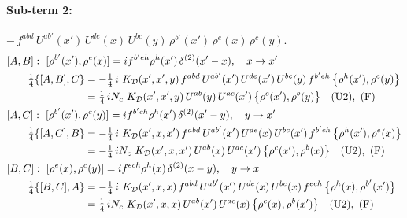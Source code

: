 \documentclass[10pt]{article}
\numberwithin{equation}{section}
\begin{document}
\paragraph{Sub-term 2:} $-\,f^{abd}\,U^{ab'}(x')\,U^{de}(x)\,U^{bc}(y)\,\rho^{b'}(x')\,\rho^{e}(x)\,\rho^{c}(y)$.
\begin{align}
&[A,B]:\ [\rho^{b'}(x'),\rho^{e}(x)]=i f^{b'eh}\rho^{h}(x')\,\delta^{(2)}(x'-x),\quad x\to x'\notag\\
&\qquad \tfrac14\{[A,B],C\}=-\tfrac14\,i\,\,K_{\mathcal D}(x',x',y)\,f^{abd}\,U^{ab'}(x')\,U^{de}(x')\,U^{bc}(y)\,f^{b'eh}\,\big\{\rho^{h}(x'),\rho^{c}(y)\big\}\notag\\
&\qquad\phantom{\tfrac14\{[A,B],C\}}=\tfrac14\,i N_{c}\,\,K_{\mathcal D}(x',x',y)\,U^{ab}(y)\,U^{ac}(x')\,\big\{\rho^{c}(x'),\rho^{b}(y)\big\}\quad\text{(U2)},\ \text{(F)}
\label{eq:D-2-AB}\\
&[A,C]:\ [\rho^{b'}(x'),\rho^{c}(y)]=i f^{b'ch}\rho^{h}(x')\,\delta^{(2)}(x'-y),\quad y\to x'\notag\\
&\qquad \tfrac14\{[A,C],B\}=-\tfrac14\,i\,\,K_{\mathcal D}(x',x,x')\,f^{abd}\,U^{ab'}(x')\,U^{de}(x)\,U^{bc}(x')\,f^{b'ch}\,\big\{\rho^{h}(x'),\rho^{e}(x)\big\}\notag\\
&\qquad\phantom{\tfrac14\{[A,C],B\}}=-\tfrac14\,i N_{c}\,\,K_{\mathcal D}(x',x,x')\,U^{ab}(x)\,U^{ac}(x')\,\big\{\rho^{c}(x'),\rho^{b}(x)\big\}\quad\text{(U2)},\ \text{(F)}
\label{eq:D-2-AC}\\
&[B,C]:\ [\rho^{e}(x),\rho^{c}(y)]=i f^{ech}\rho^{h}(x)\,\delta^{(2)}(x-y),\quad y\to x\notag\\
&\qquad \tfrac14\{[B,C],A\}=-\tfrac14\,i\,\,K_{\mathcal D}(x',x,x)\,f^{abd}\,U^{ab'}(x')\,U^{de}(x)\,U^{bc}(x)\,f^{ech}\,\big\{\rho^{h}(x),\rho^{b'}(x')\big\}\notag\\
&\qquad\phantom{\tfrac14\{[B,C],A\}}=\tfrac14\,i N_{c}\,\,K_{\mathcal D}(x',x,x)\,U^{ab}(x')\,U^{ac}(x)\,\big\{\rho^{c}(x),\rho^{b}(x')\big\}\quad\text{(U2)},\ \text{(F)}
\label{eq:D-2-BC}
\end{align}
\end{document}
